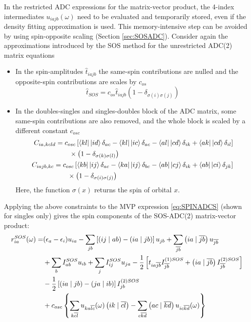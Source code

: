 In the restricted ADC expressions for the matrix-vector product, the 4-index intermediates $u_{iajb}(\omega)$ need to be evaluated and temporarily stored, even if the density fitting approximation is used. This memory-intensive step can be avoided by using spin-opposite scaling (Section \ref{sec:SOSADC}). Consider again the approximations introduced by the SOS method for the unrestricted ADC(2) matrix equations
\begin{itemize}
\item In the spin-amplitudes $\hat{t}_{iajb}$ the same-spin contributions are nulled and the opposite-spin contributions are scales by $c_{os}$
\begin{equation}
\hat{t}_{SOS} = c_{os} \hat{t}_{iajb} \left( 1 - \delta_{\sigma (i) \sigma (j)} \right)
\end{equation}
\item In the doubles-singles and singles-doubles block of the ADC matrix, some same-spin contributions are also removed, and the whole block is scaled by a different constant $c_{osc}$ 
\begin{align}
\begin{split}
C_{ia,kcld} &= c_{osc} \left[ \bra{kl} {} \ket{id} \delta_{ac} - \bra{kl} {} \ket{ic} \delta_{ac} - \bra{al} {} \ket{cd} \delta_{ik} + \bra{ak} {} \ket{cd}\delta_{il} \right] \\
& \qquad \times \left( 1 - \delta_{\sigma (k) \sigma (l)} \right)
\end{split}
\\
\begin{split}
C_{iajb,kc} &= c_{osc} \left[ \bra{kb} {} \ket{ij} \delta_{ac} - \bra{ka} {} \ket{ij} \delta_{bc} - \bra{ab} {} \ket{cj} \delta_{ik} + \bra{ab} {} \ket{ci}\delta_{jk} \right] \\
& \qquad \times \left( 1 - \delta_{\sigma (i) \sigma (j)} \right)
\end{split}
\end{align}
\noindent Here, the function $\sigma(x)$ returns the spin of orbital $x$.
\end{itemize}
Applying the above constraints to the MVP expression \ref{eq:SPINADCS} (shown for singles only) gives the spin components of the SOS-ADC(2) matrix-vector product:
\begin{equation}
\begin{split}
r_{ia}^{SOS}( \omega) = &(\epsilon_a - \epsilon_i) u_{ia} - \sum_{jb} \left[ \left( ij \mid ab \right) - \left( ia \mid jb \right) \right] u_{jb} + \sum_{\overline{jb}} \left( ia \mid \overline{jb} \right) u_{\overline{jb}} \\
&+ \sum_b I^{SOS}_{ab} u_{ib} + \sum_{j} I^{SOS}_{ij} u_{ja} - \frac{1}{2} \left[ t_{ia\overline{jb}} I^{(1)SOS}_{\overline{jb}} + \left( ia \mid \overline{jb} \right) I_{\overline{jb}}^{(2)SOS} \right] \\
&- \frac{1}{2} \left[\left( ia \mid jb \right) - \left( ja \mid ib \right) \right] I_{jb}^{(2)SOS} \\
&+ c_{osc} \left\lbrace \sum_{k\overline{cl}} u_{ka\overline{lc}}(\omega) \left( ik \mid \overline{cl} \right) - \sum_{c\overline{kd}} \left( ac \mid \overline{kd} \right) u_{ic\overline{kd}}(\omega) \right\rbrace
\end{split}
\label{SPINSOSADC2S}
\end{equation}  
